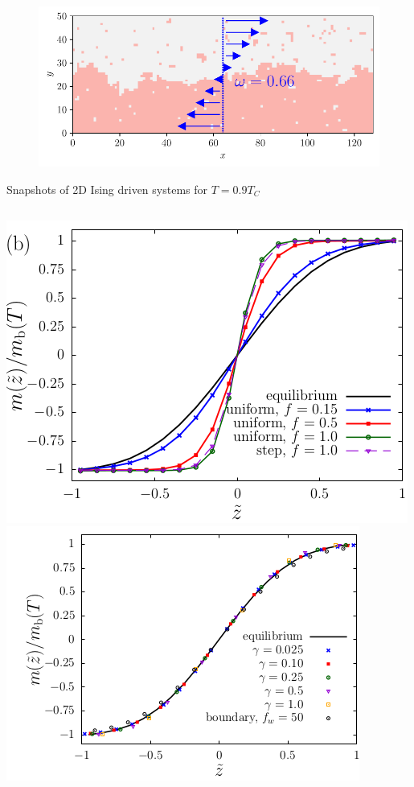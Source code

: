 \documentclass[9pt, dvipsnames]{beamer} %
\begin{document}
\begin{frame}
\begin{overprint}
\begin{figure}
		\begin{minipage}[c]{0.5\linewidth}
		\includegraphics[width=\linewidth]{cis-ising-f-066.pdf} 
		\end{minipage}
    \end{figure}  
    \centering
	Snapshots of 2D Ising driven systems for $T=0.9 T_C$
	\onslide<2>
	\begin{columns}
		\includegraphics[width=\linewidth]{smith-mag.png} \\
		\includegraphics[width=\linewidth]{smith-rescale.png}

\end{columns}
\end{overprint}
\end{frame}
\end{document}
